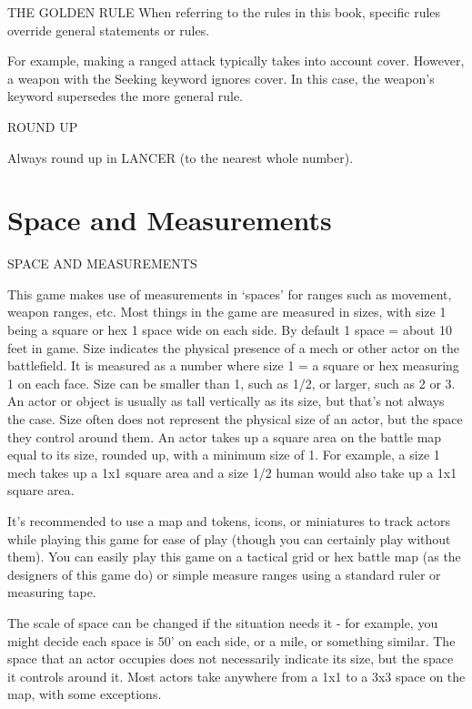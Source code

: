                                           THE GOLDEN RULE
When referring to the rules in this book, specific rules override general statements or rules.


For example, making a ranged attack typically takes into account cover. However, a weapon with
the Seeking keyword ignores cover. In this case, the weapon’s keyword supersedes the more
general rule.

                                                 ROUND UP




Always round up in LANCER (to the nearest whole number).
\chapter{Space and Measurements}
                                 SPACE AND MEASUREMENTS

This game makes use of measurements in ‘spaces’ for ranges such as movement, weapon
ranges, etc. Most things in the game are measured in sizes, with size 1 being a square or hex 1
space wide on each side. By default 1 space = about 10 feet in game. Size indicates the physical
presence of a mech or other actor on the battlefield. It is measured as a number where size 1 = a
square or hex measuring 1 on each face. Size can be smaller than 1, such as 1/2, or larger, such
as 2 or 3. An actor or object is usually as tall vertically as its size, but that’s not always the case.
Size often does not represent the physical size of an actor, but the space they control around
them. An actor takes up a square area on the battle map equal to its size, rounded up, with a
minimum size of 1. For example, a size 1 mech takes up a 1x1 square area and a size 1/2 human
would also take up a 1x1 square area.

It’s recommended to use a map and tokens, icons, or miniatures to track actors while playing this
game for ease of play (though you can certainly play without them). You can easily play this game
on a tactical grid or hex battle map (as the designers of this game do) or simple measure ranges
using a standard ruler or measuring tape.

The scale of space can be changed if the situation needs it - for example, you might decide each
space is 50’ on each side, or a mile, or something similar. The space that an actor occupies does
not necessarily indicate its size, but the space it controls around it. Most actors take anywhere
from a 1x1 to a 3x3 space on the map, with some exceptions.


